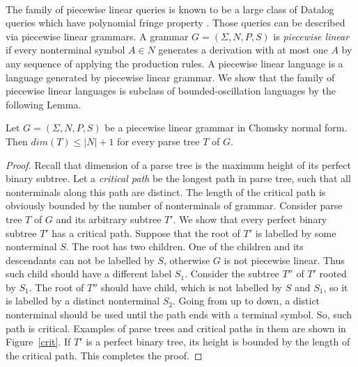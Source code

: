 \begin{example}
\\
The family of piecewise linear queries is known to be a large class of Datalog queries which have polynomial fringe property \cite{Ullman}. Those queries can be described via piecewise linear grammars. A grammar $G = (\Sigma, N, P, S)$ is \textit{piecewise linear} if every nonterminal symbol $A \in N$ generates a derivation with at most one $A$ by any sequence of applying the production rules. A piecewise linear language is a language generated by piecewise linear grammar. We show that the family of piecewise linear languages is subclass of bounded-oscillation languages by the following Lemma.
\begin{lemma}
Let  $G = (\Sigma, N, P, S)$ be a piecewise linear grammar in Chomsky normal form. Then $dim(T) \le |N| + 1$ for every parse tree $T$ of $G$.
\end{lemma}
\begin{proof} Recall that dimension of a parse tree is the maximum height of its perfect binary subtree. Let a \textit{critical path} be the longest path in parse tree, such that all nonterminals along this path are distinct. The length of the critical path is obviously bounded by the number of nonterminals of grammar.  Consider parse tree $T$ of $G$ and its arbitrary subtree $T'$. We show that every perfect binary subtree $T'$ has a critical path. Suppose that the root of $T'$ is labelled by some nonterminal $S$. The root has two children. One of the children and its descendants can not be labelled by $S$, otherwise $G$ is not piecewise linear. Thus such child should have a different label $S_1$. Consider the subtree $T''$ of $T'$ rooted by $S_1$. The root of $T''$ should have child, which is not labelled by $S$ and $S_1$, so it is labelled by a distinct nonterminal $S_2$. Going from up to down, a distict nonterminal should be used until the path ends with a terminal symbol. So, such path is critical. Examples of parse trees and critical paths in them are shown in Figure~\ref{crit}. If $T'$ is a perfect binary tree, its height is bounded by the length of the critical path. This completes the proof.
\end{proof}
\begin{figure}

\end{figure}
\end{example}
